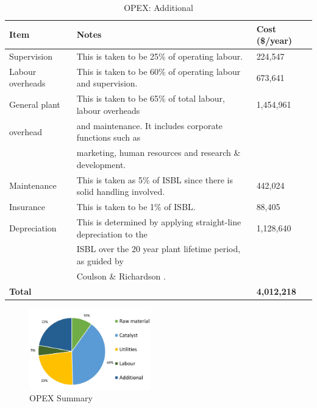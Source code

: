 \begin{table}[H]
\centering
\caption{OPEX: Additional}
\label{tab:opex-add}
\begin{tabular}{lll}
\toprule
\textbf{Item}          & \textbf{Notes}                                                          & \textbf{Cost (\$/year)} \\
\midrule
Supervision            & This is taken to be 25\% of operating labour.                           & 224,547                 \\ \midrule
Labour overheads       & This is taken to be 60\% of operating labour and supervision.           & 673,641                 \\ \midrule
General plant          & This is taken to be 65\% of total labour, labour overheads              & 1,454,961               \\ 
overhead               & and maintenance. It includes corporate functions such as                &                         \\ 
                       & marketing, human resources and research \& development.                 &                         \\ \midrule
Maintenance            & This is taken as 5\% of ISBL since there is solid handling   involved. & 442,024                 \\ \midrule
Insurance              & This is taken to be 1\% of ISBL.                                        & 88,405                  \\ \midrule
Depreciation           & This is determined by applying straight-line depreciation to the        & 1,128,640               \\ 
                       & ISBL over the 20 year plant lifetime period, as guided by               &                         \\ 
                       & Coulson \& Richardson \cite{sinnott_coulson_2005}.                                             &                         \\ \midrule
\textbf{Total}         & \textbf{}                                                               & \textbf{4,012,218}
\\\bottomrule
\end{tabular}
\end{table}

\begin{figure}
    \caption{OPEX Summary}
    \label{fig:OPEXSummary}
    \includegraphics[width=0.47\textwidth]{chapters/6-economics/figures/OPEX_summary.jpg}
\end{figure}

